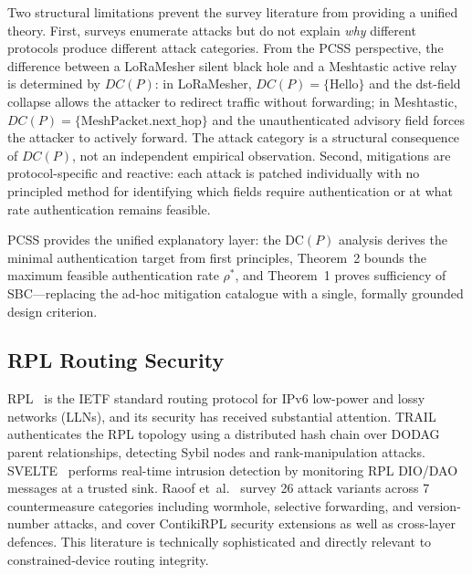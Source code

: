 \documentclass[journal,compsoc]{IEEEtran}
\theoremstyle{plain}
\theoremstyle{definition}
\theoremstyle{remark}
\begin{document}
Two structural limitations prevent the survey literature from providing a
unified theory.  First, surveys enumerate attacks but do not explain
\emph{why} different protocols produce different attack categories.  From
the PCSS perspective, the difference between a LoRaMesher silent black hole
and a Meshtastic active relay is determined by $\mathit{DC}(P)$: in
LoRaMesher, $\mathit{DC}(P) = \{\text{Hello}\}$ and the dst-field collapse
allows the attacker to redirect traffic without forwarding; in Meshtastic,
$\mathit{DC}(P) = \{\text{MeshPacket.next\_hop}\}$ and the unauthenticated
advisory field forces the attacker to actively forward.  The attack category
is a structural consequence of $\mathit{DC}(P)$, not an independent
empirical observation.  Second, mitigations are protocol-specific and
reactive: each attack is patched individually with no principled method for
identifying which fields require authentication or at what rate
authentication remains feasible.

PCSS provides the unified explanatory layer: the DC$(P)$ analysis derives
the minimal authentication target from first principles, Theorem~2 bounds
the maximum feasible authentication rate $\rho^*$, and Theorem~1 proves
sufficiency of SBC---replacing the ad-hoc mitigation catalogue with a
single, formally grounded design criterion.

\subsection{RPL Routing Security}

RPL~\cite{rfc6550} is the IETF standard routing protocol for IPv6
low-power and lossy networks (LLNs), and its security has received
substantial attention.  TRAIL~\cite{perazzo2017trail} authenticates the RPL
topology using a distributed hash chain over DODAG parent relationships,
detecting Sybil nodes and rank-manipulation attacks.
SVELTE~\cite{raza2013svelte} performs real-time intrusion detection by
monitoring RPL DIO/DAO messages at a trusted sink.  Raoof
et~al.~\cite{raoof2019routing} survey 26 attack variants across 7
countermeasure categories including wormhole, selective forwarding, and
version-number attacks, and cover ContikiRPL security extensions as well as
cross-layer defences.  This literature is technically sophisticated and
directly relevant to constrained-device routing integrity.
\end{document}
